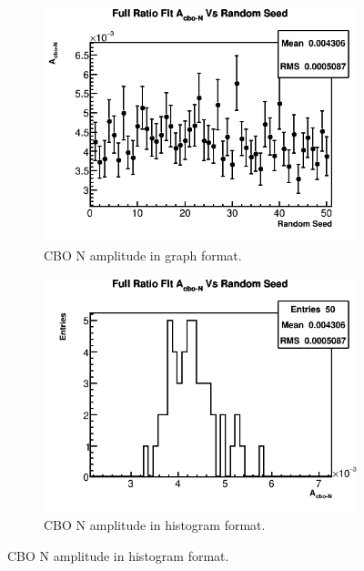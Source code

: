 \begin{figure}[]
		   	\vspace{4mm}
		    \begin{subfigure}[t]{0.45\textwidth}
			    \centering
				\includegraphics[width=\textwidth]{RatioCBO_A_cbo-N_Vs_Iter_Canv}
			    \caption{CBO N amplitude in graph format.}
		    \end{subfigure}
		    \hspace{4mm}
		    \begin{subfigure}[t]{0.45\textwidth}
			    \centering
				\includegraphics[width=\textwidth]{RatioCBO_A_cbo-N_Vs_Iter_Canv_hist}
			    \caption{CBO N amplitude in histogram format.}
		    \end{subfigure}%

\end{figure}
